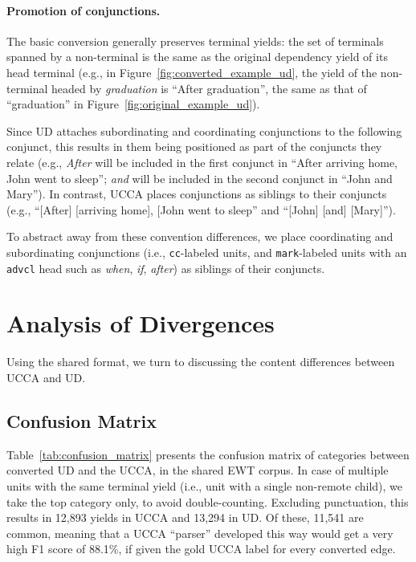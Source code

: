 \documentclass[11pt,a4paper]{article}
\begin{document}
\paragraph{Promotion of conjunctions.}
The basic conversion generally preserves terminal yields:
the set of terminals spanned by a non-terminal is the same
as the original dependency yield of its head terminal
(e.g., in Figure~\ref{fig:converted_example_ud}, the yield of the non-terminal
headed by \textit{graduation} is ``After graduation'', the same as that of ``graduation''
in Figure~\ref{fig:original_example_ud}).

Since UD attaches subordinating and coordinating conjunctions to the following conjunct,
this results in them being positioned as part
of the conjuncts they relate (e.g.,
\textit{After} will be included in the first conjunct in ``After arriving home, John went to sleep'';
\textit{and} will be included in the second conjunct in ``John and Mary'').
In contrast, UCCA places conjunctions as siblings to their conjuncts (e.g.,
``[After] [arriving home], [John went to sleep'' and ``[John] [and] [Mary]''). 

To abstract away from these convention differences,
we place 
coordinating and subordinating conjunctions 
(i.e., \texttt{cc}-labeled units, and \texttt{mark}-labeled units with an \texttt{advcl} head such 
as \textit{when}, \textit{if}, \textit{after}) as siblings of their conjuncts.


\section{Analysis of Divergences}\label{sec:analysis}

Using the shared format,
we turn to discussing the content differences between UCCA and UD.


\subsection{Confusion Matrix}\label{sec:confusion}

Table~\ref{tab:confusion_matrix} presents the confusion matrix of categories between converted UD
and the UCCA, in the shared EWT corpus.
In case of multiple units with the same terminal yield (i.e., unit with a single non-remote child),
we take the top category only, to avoid double-counting.
Excluding punctuation, this results in 12,893 yields in UCCA and
13,294 in UD.
Of these, 11,541 are common, meaning that a UCCA ``parser'' developed this way
would get a very high F1 score
of 88.1\%, if given the gold UCCA label for every converted edge.
\end{document}

